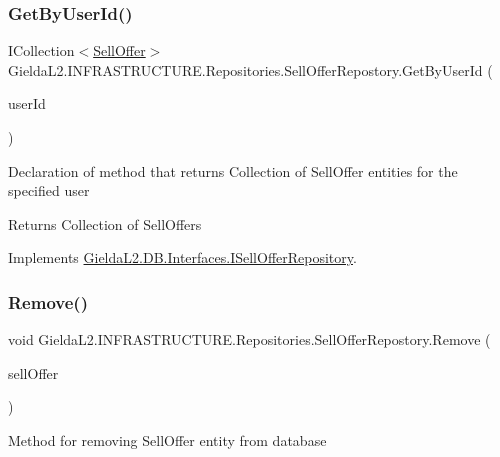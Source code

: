 \subsubsection{\texorpdfstring{GetByUserId()}{GetByUserId()}}
{\footnotesize\ttfamily I\+Collection$<$\mbox{\hyperlink{class_gielda_l2_1_1_d_b_1_1_entities_1_1_sell_offer}{Sell\+Offer}}$>$ Gielda\+L2.\+I\+N\+F\+R\+A\+S\+T\+R\+U\+C\+T\+U\+R\+E.\+Repositories.\+Sell\+Offer\+Repostory.\+Get\+By\+User\+Id (\begin{DoxyParamCaption}\item[{int}]{user\+Id }\end{DoxyParamCaption})}



Declaration of method that returns Collection of Sell\+Offer entities for the specified user 

\begin{DoxyReturn}{Returns}
Collection of Sell\+Offers
\end{DoxyReturn}


Implements \mbox{\hyperlink{interface_gielda_l2_1_1_d_b_1_1_interfaces_1_1_i_sell_offer_repository_a97f7d41b71fcbcb6c255ec3267beda01}{Gielda\+L2.\+D\+B.\+Interfaces.\+I\+Sell\+Offer\+Repository}}.

\mbox{\label{class_gielda_l2_1_1_i_n_f_r_a_s_t_r_u_c_t_u_r_e_1_1_repositories_1_1_sell_offer_repostory_ad66a43f51403182c2c341f8fcfc77715}} 
\subsubsection{\texorpdfstring{Remove()}{Remove()}}
{\footnotesize\ttfamily void Gielda\+L2.\+I\+N\+F\+R\+A\+S\+T\+R\+U\+C\+T\+U\+R\+E.\+Repositories.\+Sell\+Offer\+Repostory.\+Remove (\begin{DoxyParamCaption}\item[{\mbox{\hyperlink{class_gielda_l2_1_1_d_b_1_1_entities_1_1_sell_offer}{Sell\+Offer}}}]{sell\+Offer }\end{DoxyParamCaption})}



Method for removing Sell\+Offer entity from database 


